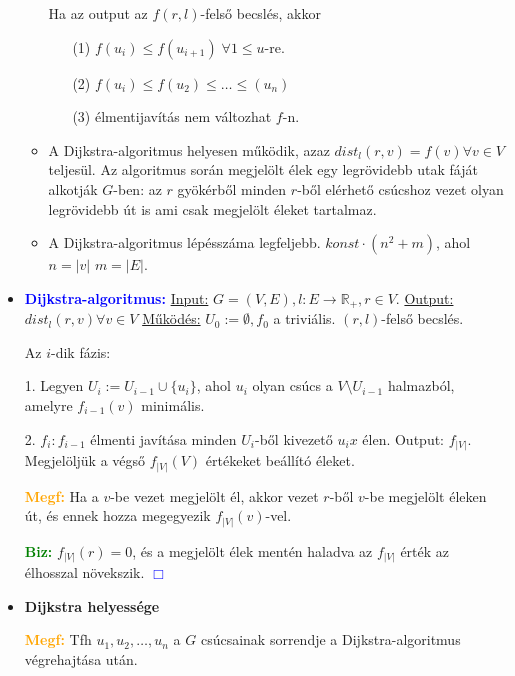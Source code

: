 \documentclass[../../szobeli.tex]{subfiles}
\begin{document}
\begin{itemize}
\begin{itemize}
            Ha az output az $f(r,l)$-felső becslés, akkor \begin{itemize}
                \item[(1)] $f(u_i) \leq f(u_{i+1}) \; \forall 1 \leq u$-re.
                \item[(2)] $f(u_i) \leq f(u_2) \leq \dots \leq (u_n)$
                \item[(3)] élmentijavítás nem változhat $f$-n.
            \end{itemize}
            \item A Dijkstra-algoritmus helyesen működik, azaz $dist_l(r,v)=f(v) \forall v\in V$ teljesül. Az algoritmus során megjelölt élek egy legrövidebb utak fáját alkotják $G$-ben: az $r$ gyökérből minden $r$-ből elérhető csúcshoz vezet olyan legrövidebb út is ami csak megjelölt éleket tartalmaz. 
            \item A Dijkstra-algoritmus lépésszáma legfeljebb. $konst \cdot (n^2+m)$, ahol $n=|v|$ $m=|E|$.
        \end{itemize}
        \item \textbf{\textcolor{blue}{Dijkstra-algoritmus:}} \underline{Input:} $G = (V,E), l : E \rightarrow \mathbb{R}_+, r \in V$. \underline{Output:} $dist_l(r,v) \forall v \in V$ \underline{Működés:} $U_0 := \emptyset, f_0$ a triviális. $(r,l)$-felső becslés. 
				
            Az $i$-dik fázis:

            1. Legyen $U_i := U_{i-1} \cup \{u_i\}$, ahol $u_i$ olyan csúcs a $V  \setminus  U_{i-1}$ halmazból, amelyre $f_{i-1}(v)$ minimális.

            2. $f_i:f_{i-1}$ élmenti javítása minden $U_i$-ből kivezető $u_ix$ élen. Output: $f_{|V|}$. Megjelöljük a végső $f_{|V|}(V)$ értékeket beállító éleket.
            
            \textcolor{orange}{\textbf{Megf:}} Ha a $v$-be vezet megjelölt él, akkor vezet $r$-ből $v$-be megjelölt éleken út, és ennek hozza megegyezik $f_{|V|} (v)$-vel.

            \textcolor{green}{\textbf{Biz:}} $f_{|V|} (r) = 0$, és a megjelölt élek mentén haladva az $f_{|V|}$ érték az élhosszal növekszik.  \textcolor{blue}{$\Box$}

        \item \textbf{Dijkstra helyessége}
				
        \textcolor{orange}{\textbf{Megf:}} Tfh $u_1, u_2, \dots, u_n$ a $G$ csúcsainak sorrendje a Dijkstra-algoritmus végrehajtása után. 


\end{itemize}
\end{document}
